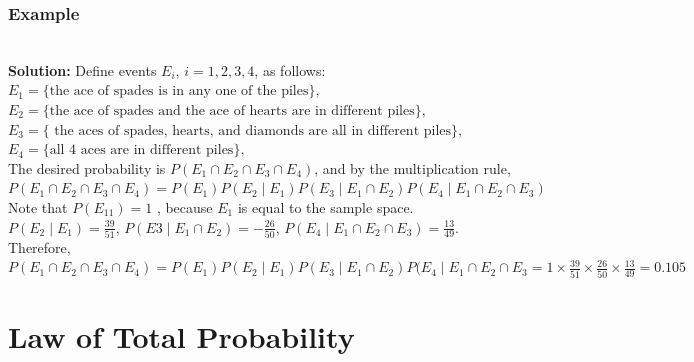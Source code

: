 \documentclass[compress]{beamer}
\begin{document}
\begin{frame}\frametitle{Example}
\\
\pause
\vspace{.9in}
{\tiny {\bf Solution:}  
Define events $E_i$, $i =1, 2, 3, 4$, as follows:
$E_1 = \{\text{the ace of spades is in any one of the piles}\},$\\
$E_2 = \{\text{the ace of spades and the ace of hearts are in different piles}\},$\\
$E_3 = \{\text{ the aces of spades, hearts, and diamonds are all in different piles}\},$\\
$E_4 = \{\text{all 4 aces are in different piles}\},$\\

The desired probability is $P(E_1\cap E_2 \cap E_3 \cap E_4)$, and by the multiplication rule,
$P(E_1\cap E_2 \cap E_3 \cap E_4)=P(E_1) P( E_2\mid  E_1)P(E_3 \mid E_1 \cap E_2) P(   E_4 \mid E_1\cap E_2 \cap E_3 ) $\\
Note that 
$P(E_11) = 1$ ,  because $E_1$ is equal to the sample space.
$P(E_2\mid E_1) = \frac{39}{51}$, $P(E3\mid E_1 \cap  E_2) =-\frac{26}{50}$,  $P(E_4 \mid E_1\cap E_2 \cap E_3) = \frac{13}{49}.$\\ Therefore, 
$P(E_1\cap E_2 \cap E_3 \cap E_4)=P(E_1) P( E_2\mid  E_1)P(E_3 \mid E_1 \cap E_2) P(   E_4 \mid E_1\cap E_2 \cap E_3 =1 \times   \frac{39}{51}\times \frac{26}{50} \times  \frac{13}{49}  = 0.105$
}
\vspace{2in}

\end{frame}





\section{Law of Total Probability}
\end{document}
